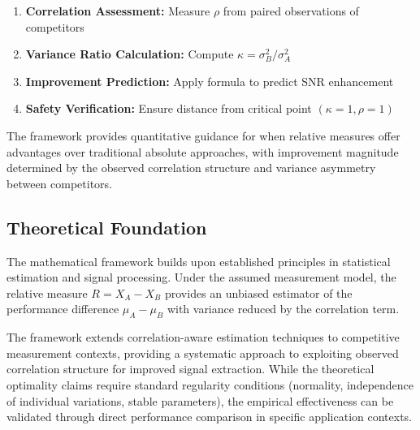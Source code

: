 \begin{enumerate}
    \item \textbf{Correlation Assessment:} Measure $\rho$ from paired observations of competitors
    \item \textbf{Variance Ratio Calculation:} Compute $\kappa = \sigma_B^2/\sigma_A^2$
    \item \textbf{Improvement Prediction:} Apply formula to predict SNR enhancement
    \item \textbf{Safety Verification:} Ensure distance from critical point $(\kappa=1, \rho=1)$
\end{enumerate}

The framework provides quantitative guidance for when relative measures offer advantages over traditional absolute approaches, with improvement magnitude determined by the observed correlation structure and variance asymmetry between competitors.

\subsection{Theoretical Foundation}

The mathematical framework builds upon established principles in statistical estimation and signal processing. Under the assumed measurement model, the relative measure $R = X_A - X_B$ provides an unbiased estimator of the performance difference $\mu_A - \mu_B$ with variance reduced by the correlation term.

The framework extends correlation-aware estimation techniques to competitive measurement contexts, providing a systematic approach to exploiting observed correlation structure for improved signal extraction. While the theoretical optimality claims require standard regularity conditions (normality, independence of individual variations, stable parameters), the empirical effectiveness can be validated through direct performance comparison in specific application contexts.
